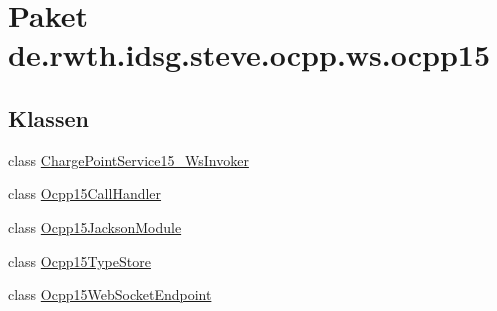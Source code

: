 \hypertarget{namespacede_1_1rwth_1_1idsg_1_1steve_1_1ocpp_1_1ws_1_1ocpp15}{\section{Paket de.\+rwth.\+idsg.\+steve.\+ocpp.\+ws.\+ocpp15}
\label{namespacede_1_1rwth_1_1idsg_1_1steve_1_1ocpp_1_1ws_1_1ocpp15}
}
\subsection*{Klassen}
\begin{DoxyCompactItemize}
\item 
class \hyperlink{classde_1_1rwth_1_1idsg_1_1steve_1_1ocpp_1_1ws_1_1ocpp15_1_1_charge_point_service15___ws_invoker}{Charge\+Point\+Service15\+\_\+\+Ws\+Invoker}
\item 
class \hyperlink{classde_1_1rwth_1_1idsg_1_1steve_1_1ocpp_1_1ws_1_1ocpp15_1_1_ocpp15_call_handler}{Ocpp15\+Call\+Handler}
\item 
class \hyperlink{classde_1_1rwth_1_1idsg_1_1steve_1_1ocpp_1_1ws_1_1ocpp15_1_1_ocpp15_jackson_module}{Ocpp15\+Jackson\+Module}
\item 
class \hyperlink{classde_1_1rwth_1_1idsg_1_1steve_1_1ocpp_1_1ws_1_1ocpp15_1_1_ocpp15_type_store}{Ocpp15\+Type\+Store}
\item 
class \hyperlink{classde_1_1rwth_1_1idsg_1_1steve_1_1ocpp_1_1ws_1_1ocpp15_1_1_ocpp15_web_socket_endpoint}{Ocpp15\+Web\+Socket\+Endpoint}
\end{DoxyCompactItemize}

